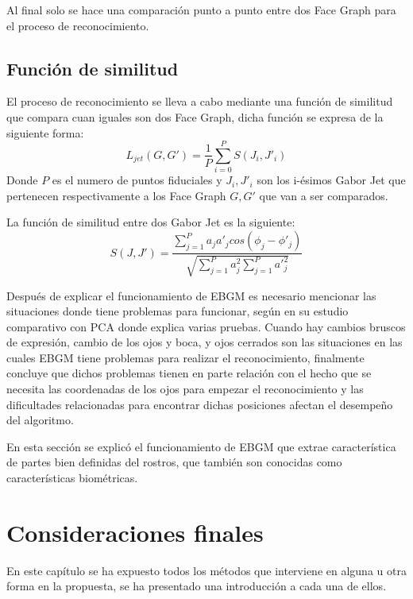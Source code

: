 Al final solo se hace una comparación punto a punto entre dos Face Graph para el proceso de reconocimiento.

\subsection{Función de similitud}
El proceso de reconocimiento se lleva a cabo mediante una función de similitud que compara cuan iguales son dos Face Graph, dicha función se expresa de la siguiente forma:
\begin{equation}
\label{FaceGraphSimiFunc}
L_{jet}(G,G')=\frac{1}{P}\sum_{i=0}^{P}S(J_{i},J'_{i})
\end{equation}
Donde $P$ es el numero de puntos fiduciales y $J_i,J'_i$ son los i-ésimos Gabor Jet que pertenecen respectivamente a los Face Graph $G,G'$ que van a ser comparados.

La función de similitud entre dos Gabor Jet es la siguiente:
\begin{equation}
\label{GaborJetSimiFunc}
S(J,J')=\frac{\sum_{j=1}^{P}a_j a'_jcos(\phi_j-\phi'_j)}{\sqrt{\sum_{j=1}^{P}a_j^2 \sum_{j=1}^{P}{a'}_j^2}}
\end{equation}

Después de explicar el funcionamiento de \ac{EBGM} es necesario mencionar las situaciones donde tiene problemas para funcionar, según \cite{givens2004features} en su estudio comparativo con \ac{PCA} donde explica varias pruebas. Cuando hay cambios bruscos de expresión, cambio de los ojos y boca, y ojos cerrados son las situaciones en las cuales \ac{EBGM} tiene problemas para realizar el reconocimiento, finalmente concluye que dichos problemas tienen en parte relación con el hecho que se necesita las coordenadas de los ojos para empezar el reconocimiento y las dificultades relacionadas para encontrar dichas posiciones afectan el desempeño del algoritmo.

En esta sección se explicó el funcionamiento de \ac{EBGM} que extrae característica de partes bien definidas del rostros, que también son conocidas como características biométricas.


\section{Consideraciones finales}
En este capítulo se ha expuesto todos los métodos que interviene en alguna u otra forma en la propuesta, se ha presentado una introducción a cada una de ellos.

